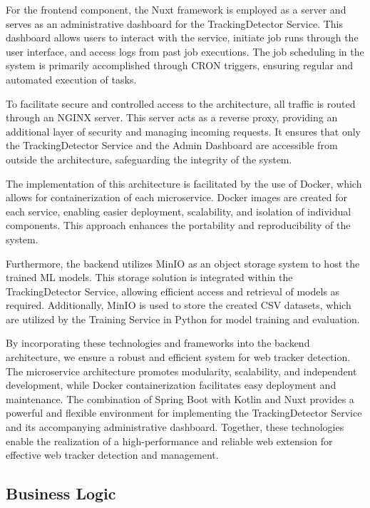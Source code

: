 For the frontend component, the Nuxt framework is employed as a server and serves as an administrative dashboard
for the TrackingDetector Service. This dashboard allows users to interact with the service, initiate job runs through
the user interface, and access logs from past job executions. The job scheduling in the system is primarily accomplished
through CRON triggers, ensuring regular and automated execution of tasks.

To facilitate secure and controlled access to the architecture, all traffic is routed through an NGINX server. This server
acts as a reverse proxy, providing an additional layer of security and managing incoming requests. It ensures that only
the TrackingDetector Service and the Admin Dashboard are accessible from outside the architecture, safeguarding the integrity
of the system.

The implementation of this architecture is facilitated by the use of Docker, which allows for containerization of each microservice.
Docker images are created for each service, enabling easier deployment, scalability, and isolation of individual components.
This approach enhances the portability and reproducibility of the system.

Furthermore, the backend utilizes MinIO as an object storage system to host the trained ML models. This storage solution
is integrated within the TrackingDetector Service, allowing efficient access and retrieval of models as required. Additionally,
MinIO is used to store the created CSV datasets, which are utilized by the Training Service in Python for model training and evaluation.

By incorporating these technologies and frameworks into the backend architecture, we ensure a robust and efficient system
for web tracker detection. The microservice architecture promotes modularity, scalability, and independent development,
while Docker containerization facilitates easy deployment and maintenance. The combination of Spring Boot with Kotlin and Nuxt
provides a powerful and flexible environment for implementing the TrackingDetector Service and its accompanying administrative dashboard. Together, these technologies enable the realization of a high-performance and reliable web extension for effective web tracker detection and management.

\subsection{Business Logic}

